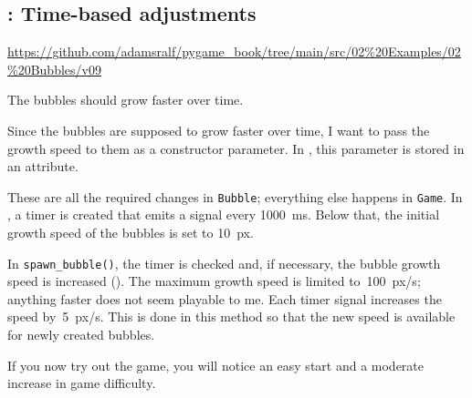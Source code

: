 

\subsection{: Time-based adjustments}
\begin{diskbox}
	\url{https://github.com/adamsralf/pygame_book/tree/main/src/02%20Examples/02%20Bubbles/v09}
\end{diskbox}

	The bubbles should grow faster over time.
\er

Since the bubbles are supposed to grow faster over time, I want to pass the growth speed to them as a constructor parameter. In , this parameter is stored in an attribute.


These are all the required changes in \texttt{Bubble}; everything else happens in \texttt{Game}. In , a timer is created that emits a signal every \SI{1000}{ms}. Below that, the initial growth speed of the bubbles is set to \SI{10}{px}.


In \texttt{spawn\_bubble()}, the timer is checked and, if necessary, the bubble growth speed is increased (). The maximum growth speed is limited to~\SI{100}{px/s}; anything faster does not seem playable to me. Each timer signal increases the speed by~\SI{5}{px/s}. This is done in this method so that the new speed is available for newly created bubbles.


If you now try out the game, you will notice an easy start and a moderate increase in game difficulty.


